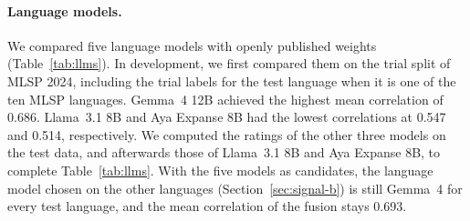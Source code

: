\documentclass[11pt]{article}
\begin{document}
\paragraph{Language models.} We compared five language models with openly published weights
(Table~\ref{tab:llms}). In development, we first compared them on the trial split of MLSP 2024,
including the trial labels for the test language when it is one of the ten MLSP languages. Gemma~4 %
12B achieved the highest mean correlation of 0.686. Llama~3.1 8B \citep{grattafiori-etal-2024-llama3} and Aya Expanse 8B \citep{dang-etal-2024-aya} had the lowest %
correlations at 0.547 and 0.514, respectively. We computed the ratings of the other three models on
the test data, and afterwards those of Llama~3.1 8B and Aya Expanse 8B, to complete
Table~\ref{tab:llms}. With the five models as candidates, the language model chosen on the other %
languages (Section~\ref{sec:signal-b}) is still Gemma~4 for every test language, and the mean
correlation of the fusion stays 0.693. %
\end{document}
